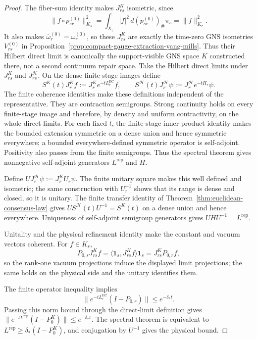 \begin{proof}
The fiber-sum identity makes \(J^K_{rs}\) isometric, since
\[
\|f\circ p_{sr}^{(0)}\|_{K_s}^2
=\int_{X_r}|f|^2\,d(p_{sr}^{(0)})_\#\pi_s
=\|f\|_{K_r}^2.
\]
It also makes \(\overline\omega_r^{(0)}=\omega_r^{(0)}\), so these \(J^K_{rs}\) are exactly the
time-zero GNS isometries \(V_{rs}^{(0)}\) in
Proposition~\ref{prop:compact-gauge-extraction-yang-mills}. Thus their
Hilbert direct limit is canonically the support-visible GNS space \(K\) constructed there, not a
second continuum repair space.
Take the Hilbert direct limits under \(J^K_{rs}\) and \(J^{\mathcal H}_{rs}\). On the dense
finite-stage images define
\[
S^K(t)J_r^Kf:=J_r^Ke^{-tL_r^{\mathrm{EC}}}f,
\qquad
S^{\mathcal H}(t)J_r^{\mathcal H}\psi
:=J_r^{\mathcal H}e^{-tH_r}\psi.
\]
The finite coherence identities make these definitions independent of the representative. They
are contraction semigroups. Strong continuity holds on every finite-stage image and therefore,
by density and uniform contractivity, on the whole direct limits. For each fixed \(t\), the
finite-stage inner-product identity makes the bounded extension symmetric on a dense union and
hence symmetric everywhere; a bounded everywhere-defined symmetric operator is self-adjoint.
Positivity also passes from the finite semigroups. Thus the spectral theorem gives nonnegative
self-adjoint generators \(L^{\mathrm{rep}}\) and \(H\).

Define \(UJ_r^{\mathcal H}\psi:=J_r^KU_r\psi\). The finite unitary square makes this well defined
and isometric; the same construction with \(U_r^{-1}\) shows that its range is dense and closed,
so it is unitary. The finite transfer identity of
Theorem~\ref{thm:euclidean-consensus-law} gives
\(US^{\mathcal H}(t)U^{-1}=S^K(t)\) on a dense union and hence everywhere. Uniqueness of
self-adjoint semigroup generators gives \(UHU^{-1}=L^{\mathrm{rep}}\).

Unitality and the physical refinement identity make the constant and vacuum vectors coherent.
For \(f\in K_r\),
\[
P_{0,s}J^K_{rs}f
=\langle\mathbf 1_s,J^K_{rs}f\rangle\mathbf 1_s
=J^K_{rs}P_{0,r}f,
\]
so the rank-one vacuum projections induce the displayed limit projections; the same holds on the
physical side and the unitary identifies them.

The finite operator inequality implies
\[
\|e^{-tL_r^{\mathrm{EC}}}(I-P_{0,r})\|\le e^{-\delta_*t}.
\]
Passing this norm bound through the direct-limit definition gives
\(\|e^{-tL^{\mathrm{rep}}}(I-P_0^K)\|\le e^{-\delta_*t}\). The spectral theorem is equivalent to
\(L^{\mathrm{rep}}\ge \delta_*(I-P_0^K)\), and conjugation by \(U^{-1}\) gives the physical bound.
\end{proof}

